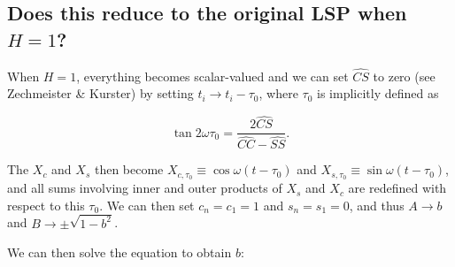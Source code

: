 \documentclass[notitlepage]{article}
\newcommand{\Xs}{X_s}
\newcommand{\Xc}{X_c}
\newcommand{\Xst}{X_{s, \tau_0}}
\newcommand{\Xct}{X_{c, \tau_0}}
\newcommand{\hatCS}[1][nm]{\widehat{CS}}
\newcommand{\hatCC}[1][nm]{\widehat{CC}}
\newcommand{\hatSS}[1][nm]{\widehat{SS}}
\begin{document}
\subsection{Does this reduce to the original LSP when $H=1$?}
When $H = 1$, everything becomes scalar-valued and we can set $\hatCS$ to zero (see Zechmeister \& Kurster) by setting $t_i \rightarrow t_i - \tau_0$, where $\tau_0$ is implicitly defined as

\begin{equation}
\tan2\omega\tau_0 = \frac{2\hatCS}{\hatCC - \hatSS}.
\end{equation}

The $\Xc$ and $\Xs$ then become $\Xct\equiv\cos{\omega(t - \tau_0)}$ and $\Xst\equiv\sin{\omega(t-\tau_0)}$, and all sums involving inner and outer products of $X_s$ and $X_c$ are redefined with respect to this $\tau_0$. We can then set $c_n = c_1 = 1$ and $s_n = s_1 = 0$, and thus $A\rightarrow b$ and $B\rightarrow\pm\sqrt{1 - b^2}$.

We can then solve the equation to obtain $b$:
\end{document}
